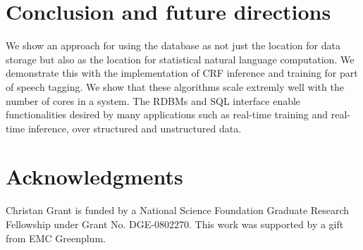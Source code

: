 \documentclass[11pt,letterpaper]{article}
\begin{document}

\section{Conclusion and future directions}
We show an approach for using the database as not just the location for
data storage but also as the location for statistical natural language 
computation.
We demonstrate this with the implementation of CRF inference and training 
for part of speech tagging.
We show that these algorithms scale extremly well with the number of cores
in a system.
The RDBMs and SQL interface enable functionalities desired by many 
applications such as real-time training and real-time inference, over
structured and unstructured data.




\section*{Acknowledgments}
Christan Grant is funded by a National
Science Foundation Graduate Research Fellowship under Grant No. DGE-0802270.
This work was supported by a gift from EMC Greenplum.


%

\end{document}
